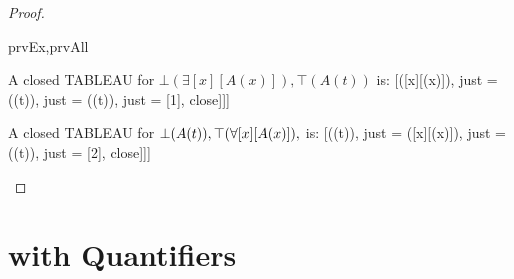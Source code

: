 \documentclass[10pt,a4paper]{article}
\newcommand*{\olup}[1]{\MakeUppercase{#1}}
\theoremstyle{plain}
\theoremstyle{definition}
\theoremstyle{remark}
\newcommand*{\olfileid}[3]{}
\newcommand*{\olsection}[1]{\section*{#1}}
\newenvironment{oltableau}{}{}
\providecommand{\lforall}{\mathord{\forall}}
\providecommand{\lexists}{\mathord{\exists}}
\providecommand{\sFmla}[2]{#1(#2)}
\providecommand{\formula}{\relax}
\providecommand{\True}{\top}
\providecommand{\False}{\bot}
\providecommand{\tagitem}[1]{\item[#1]}
\providecommand{\TAss}[1]{}
\providecommand{\TRule}[1]{}
\providecommand{\formula}[1]{#1}
\begin{document}
\begin{proof}
\begin{tagenumerate}{prvEx,prvAll}
\tagitem{prvEx}{A closed \olup{tableau} for
  $\sFmla{\False}{\lexists[x][A(x)]}, \sFmla{\True}{A(t)}$ is:
  \begin{oltableau}
    [\sFmla{\False}{\lexists[x][\formula{A}(x)]}, just = \TAss
      [\sFmla{\True}{\formula{A}(t)}, just = \TAss
        [\sFmla{\False}{\formula{A}(t)}, just = {\TRule{\False}{\lexists}[1]}, close]]]
    \end{oltableau}}{}
\tagitem{prvAll}{A closed \olup{tableau} for
  $\sFmla{\False}{\formula{A}(t)}, \sFmla{\True}{\lforall[x][A(x)]}, $ is:
  \begin{oltableau}
    [\sFmla{\False}{\formula{A}(t)}, just = \TAss
      [\sFmla{\True}{\lforall[x][\formula{A}(x)]}, just = \TAss
        [\sFmla{\True}{\formula{A}(t)}, just = {\TRule{\True}{\lforall}[2]}, close]]]
    \end{oltableau}}{}
\end{tagenumerate}
\end{proof}





\olfileid{fol}{tab}{prq}

\olsection{ with Quantifiers}
\end{document}
